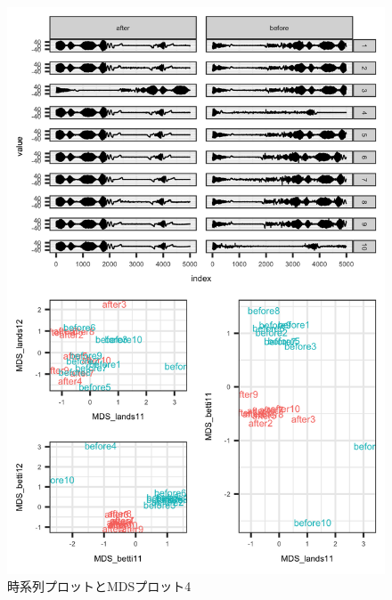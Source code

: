 \documentclass{jarticle}
\begin{document}
\begin{figure}[H]
	\begin{center}
		\includegraphics[width=15cm]{fig/MDS_plot4.png}
		\caption{時系列プロットとMDSプロット4}
		\label{fig:MDS_plot4}
	\end{center}
\end{figure}
\end{document}
